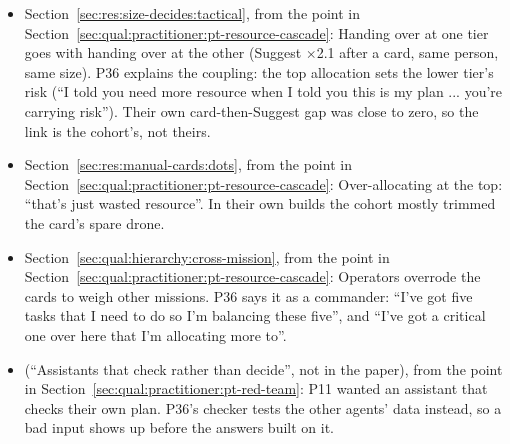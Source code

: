 \begin{itemize}[leftmargin=1.2em,itemsep=1pt]
\item Section~\ref{sec:res:size-decides:tactical}, from the point in Section~\ref{sec:qual:practitioner:pt-resource-cascade}: Handing over at one tier goes with handing over at the other (Suggest $\times$2.1 after a card, same person, same size). P36 explains the coupling: the top allocation sets the lower tier's risk (``I told you need more resource when I told you this is my plan ... you're carrying risk''). Their own card-then-Suggest gap was close to zero, so the link is the cohort's, not theirs.
\item Section~\ref{sec:res:manual-cards:dots}, from the point in Section~\ref{sec:qual:practitioner:pt-resource-cascade}: Over-allocating at the top: ``that's just wasted resource''. In their own builds the cohort mostly trimmed the card's spare drone.
\item Section~\ref{sec:qual:hierarchy:cross-mission}, from the point in Section~\ref{sec:qual:practitioner:pt-resource-cascade}: Operators overrode the cards to weigh other missions. P36 says it as a commander: ``I've got five tasks that I need to do so I'm balancing these five'', and ``I've got a critical one over here that I'm allocating more to''.
\item (``Assistants that check rather than decide'', not in the paper), from the point in Section~\ref{sec:qual:practitioner:pt-red-team}: P11 wanted an assistant that checks their own plan. P36's checker tests the other agents' data instead, so a bad input shows up before the answers built on it.
\end{itemize}
